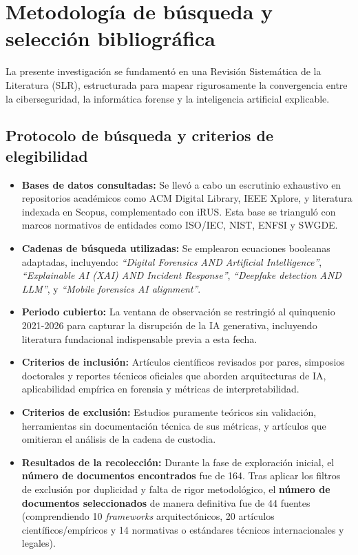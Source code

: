 \documentclass[journal]{IEEEtran}
\begin{document}
\section{Metodología de búsqueda y selección bibliográfica}
La presente investigación se fundamentó en una Revisión Sistemática de la Literatura (SLR), estructurada para mapear rigurosamente la convergencia entre la ciberseguridad, la informática forense y la inteligencia artificial explicable.

\subsection{Protocolo de búsqueda y criterios de elegibilidad}
\begin{itemize}
    \item \textbf{Bases de datos consultadas:} Se llevó a cabo un escrutinio exhaustivo en repositorios académicos como ACM Digital Library, IEEE Xplore, y literatura indexada en Scopus, complementado con iRUS. Esta base se trianguló con marcos normativos de entidades como ISO/IEC, NIST, ENFSI y SWGDE.
    \item \textbf{Cadenas de búsqueda utilizadas:} Se emplearon ecuaciones booleanas adaptadas, incluyendo: \textit{``Digital Forensics AND Artificial Intelligence''}, \textit{``Explainable AI (XAI) AND Incident Response''}, \textit{``Deepfake detection AND LLM''}, y \textit{``Mobile forensics AI alignment''}.
    \item \textbf{Periodo cubierto:} La ventana de observación se restringió al quinquenio 2021-2026 para capturar la disrupción de la IA generativa, incluyendo literatura fundacional indispensable previa a esta fecha.
    \item \textbf{Criterios de inclusión:} Artículos científicos revisados por pares, simposios doctorales y reportes técnicos oficiales que aborden arquitecturas de IA, aplicabilidad empírica en forensia y métricas de interpretabilidad.
    \item \textbf{Criterios de exclusión:} Estudios puramente teóricos sin validación, herramientas sin documentación técnica de sus métricas, y artículos que omitieran el análisis de la cadena de custodia.
    \item \textbf{Resultados de la recolección:} Durante la fase de exploración inicial, el \textbf{número de documentos encontrados} fue de 164. Tras aplicar los filtros de exclusión por duplicidad y falta de rigor metodológico, el \textbf{número de documentos seleccionados} de manera definitiva fue de 44 fuentes (comprendiendo 10 \textit{frameworks} arquitectónicos, 20 artículos científicos/empíricos y 14 normativas o estándares técnicos internacionales y legales).
\end{itemize}
\end{document}
